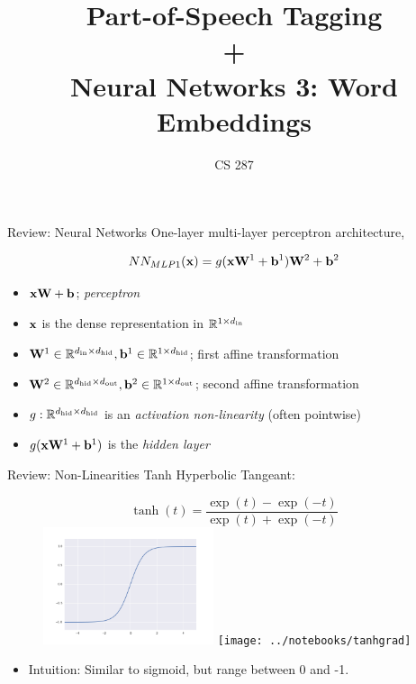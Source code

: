 \documentclass{beamer}
\title{Part-of-Speech Tagging \\ + \\ Neural Networks 3: Word Embeddings}
\date{}
\author{CS 287}
\begin{document}
\begin{frame}
  \titlepage
\end{frame}


\begin{frame}{Review: Neural Networks}
  One-layer multi-layer perceptron architecture,

  \[NN_{MLP1}(\mathbf{x}) =  g(\mathbf{x}\mathbf{W}^1 + \mathbf{b}^1)\mathbf{W}^2 + \mathbf{b}^2\]
  \begin{itemize}
  \item $\mathbf{x}\mathbf{W} + \mathbf{b}$; \textit{perceptron}
  \item $\mathbf{x}$ is the dense representation in $\mathbb{R}^{1 \times {d_{\mathrm{in}}}}$
  \item $\mathbf{W}^1 \in \mathbb{R}^{{d_{\mathrm{in}}} \times {d_{\mathrm{hid}}}}, \mathbf{b}^1 \in \mathbb{R}^{1 \times {d_{\mathrm{hid}}}}$; first affine transformation
  \item $\mathbf{W}^2 \in \mathbb{R}^{{d_{\mathrm{hid}}} \times {d_{\mathrm{out}}}}, \mathbf{b}^2 \in \mathbb{R}^{1 \times {d_{\mathrm{out}}}}$; second affine transformation
  \item $g:\mathbb{R}^{{d_{\mathrm{hid}}} \times {d_{\mathrm{hid}}}}$ is an \textit{activation non-linearity} (often pointwise)
  \item $g(\mathbf{x}\mathbf{W}^1 + \mathbf{b}^1)$ is the \textit{hidden layer}
  \end{itemize}
\end{frame}

\begin{frame}{Review: Non-Linearities Tanh}
  Hyperbolic Tangeant:
  \begin{figure}
    \centering
    \[\tanh(t) = \frac{\exp(t) - \exp(-t)}{\exp(t) + \exp(-t)}  \]
    \includegraphics[width=5cm]{../notebooks/tanh}
    \texttt{[image: ../notebooks/tanhgrad]}
  \end{figure}
  \begin{itemize}
  \item Intuition: Similar to sigmoid, but range between 0 and -1.
  \end{itemize}
\end{frame}
\end{document}
